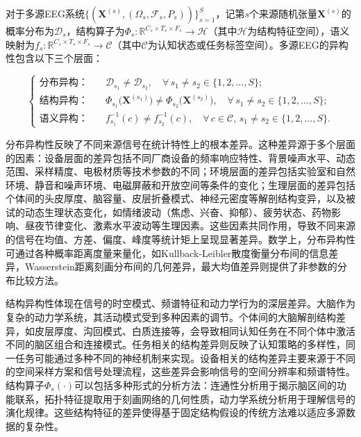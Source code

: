 \begin{definition}[多源信号的异构性特征]
\label{def:hetero}
对于多源EEG系统$\{(\mathbf{X}^{(s)}, (\Omega_s, \mathcal{F}_s, P_s))\}_{s=1}^{S}$，记第$s$个来源随机张量$\mathbf{X}^{(s)}$的概率分布为$\mathcal{D}_s$，结构算子为$\Phi_s: \mathbb{R}^{C_s \times T_s \times F_s} \to \mathcal{H}$（其中$\mathcal{H}$为结构特征空间），语义映射为$f_s: \mathbb{R}^{C_s \times T_s \times F_s} \to \mathcal{C}$（其中$\mathcal{C}$为认知状态或任务标签空间）。多源EEG的异构性包含以下三个层面：

\begin{equation}
\label{eq:hetero}
\left\{
\begin{aligned}
\text{分布异构：}&\quad \mathcal{D}_{s_1} \neq \mathcal{D}_{s_2}, \quad \forall\, s_1 \neq s_2 \in \{1,2,\ldots,S\};\\
\text{结构异构：}&\quad \Phi_{s_1}\!\big(\mathbf{X}^{(s_1)}\big) \neq \Phi_{s_2}\!\big(\mathbf{X}^{(s_2)}\big), \quad \forall\, s_1 \neq s_2 \in \{1,2,\ldots,S\};\\
\text{语义异构：}&\quad f_{s_1}^{-1}(c) \neq f_{s_2}^{-1}(c), \quad \forall\, c \in \mathcal{C}, \, s_1 \neq s_2 \in \{1,2,\ldots,S\}.
\end{aligned}
\right.
\end{equation}
\end{definition}


分布异构性反映了不同来源信号在统计特性上的根本差异。这种差异源于多个层面的因素：设备层面的差异包括不同厂商设备的频率响应特性、背景噪声水平、动态范围、采样精度、电极材质等技术参数的不同；环境层面的差异包括实验室和自然环境、静音和噪声环境、电磁屏蔽和开放空间等条件的变化；生理层面的差异包括个体间的头皮厚度、脑容量、皮层折叠模式、神经元密度等解剖结构变异，以及被试的动态生理状态变化，如情绪波动（焦虑、兴奋、抑郁）、疲劳状态、药物影响、昼夜节律变化、激素水平波动等生理因素。这些因素共同作用，导致不同来源的信号在均值、方差、偏度、峰度等统计矩上呈现显著差异。数学上，分布异构性可通过各种概率距离度量来量化，如Kullback-Leibler散度衡量分布间的信息差异，Wasserstein距离刻画分布间的几何差异，最大均值差异则提供了非参数的分布比较方法。

结构异构性体现在信号的时空模式、频谱特征和动力学行为的深层差异。大脑作为复杂的动力学系统，其活动模式受到多种因素的调节。个体间的大脑解剖结构差异，如皮层厚度、沟回模式、白质连接等，会导致相同认知任务在不同个体中激活不同的脑区组合和连接模式。任务相关的结构差异则反映了认知策略的多样性，同一任务可能通过多种不同的神经机制来实现。设备相关的结构差异主要来源于不同的空间采样方案和信号处理流程，这些差异会影响信号的空间分辨率和频谱特性。结构算子$\Phi_s(\cdot)$可以包括多种形式的分析方法：连通性分析用于揭示脑区间的功能联系，拓扑特征提取用于刻画网络的几何性质，动力学系统分析用于理解信号的演化规律。这些结构特征的差异使得基于固定结构假设的传统方法难以适应多源数据的复杂性。

